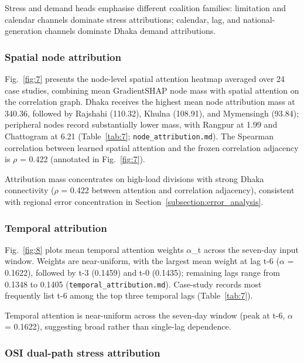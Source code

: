 Stress and demand heads emphasise different coalition families: limitation and calendar channels dominate stress attributions; calendar, lag, and national-generation channels dominate Dhaka demand attributions.

\subsubsection{Spatial node attribution}\label{subsubsection:spatial_node_attribution}

Fig.~\ref{fig:7} presents the node-level spatial attention heatmap averaged over 24 case studies, combining mean GradientSHAP node mass with spatial attention on the correlation graph. Dhaka receives the highest mean node attribution mass at 340.36, followed by Rajshahi (110.32), Khulna (108.91), and Mymensingh (93.84); peripheral nodes record substantially lower mass, with Rangpur at 1.99 and Chattogram at 6.21 (Table~\ref{tab:7}; \texttt{node\_attribution.md}). The Spearman correlation between learned spatial attention and the frozen correlation adjacency is $\rho$ = 0.422 (annotated in Fig.~\ref{fig:7}).

Attribution mass concentrates on high-load divisions with strong Dhaka connectivity ($\rho$ = 0.422 between attention and correlation adjacency), consistent with regional error concentration in Section~\ref{subsection:error_analysis}.

\subsubsection{Temporal attribution}\label{subsubsection:temporal_attribution}

Fig.~\ref{fig:8} plots mean temporal attention weights $\alpha$\_t across the seven-day input window. Weights are near-uniform, with the largest mean weight at lag t-6 ($\alpha$ = 0.1622), followed by t-3 (0.1459) and t-0 (0.1435); remaining lags range from 0.1348 to 0.1405 (\texttt{temporal\_attribution.md}). Case-study records most frequently list t-6 among the top three temporal lags (Table~\ref{tab:7}).

Temporal attention is near-uniform across the seven-day window (peak at t-6, $\alpha$ = 0.1622), suggesting broad rather than single-lag dependence.

\subsubsection{OSI dual-path stress attribution}\label{subsubsection:osi_dual_path_stress_attribution}

